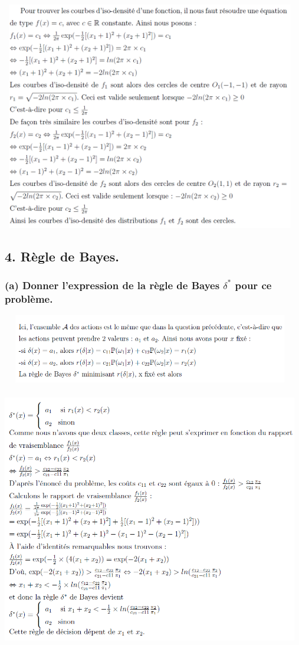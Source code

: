 \documentclass[a4paper, 8pt]{article}
\begin{document}
\includegraphics[height = 10cm, width = 13cm]{plots/f3.png}
\\
\newpage

\subsection*{4. Règle de Bayes.}

\subsubsection*{(a) Donner l'expression de la règle de Bayes $\delta^{*}$ pour ce problème.}

\includegraphics[height = 3cm, width = 13cm]{plots/f4.png}\\
\includegraphics[height = 12cm, width = 13cm]{plots/f5.png}
\end{document}

